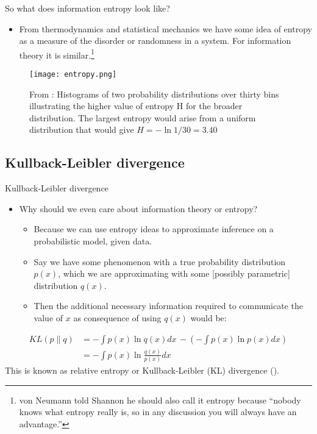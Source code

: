 \documentclass{beamer}
\begin{document}
\begin{frame}{So what does information entropy look like?}
\begin{itemize}
\item From thermodynamics and statistical mechanics we have some idea of entropy as a measure of the disorder or randomness in a system. For information theory it is similar.\footnote{von Neumann told Shannon he should also call it entropy because ``nobody knows what entropy really is, so in any discussion you will always have an advantage.''}
\end{itemize}

\begin{figure}
\texttt{[image: entropy.png]}
\caption{\label{fig:entropy}From \cite{bishop}: Histograms of two probability distributions over thirty bins illustrating the higher value of entropy H for the broader distribution. The largest entropy would arise from a uniform distribution that would give $H = -\ln 1/30 = 3.40$}
\end{figure}

\end{frame}


\subsection{Kullback-Leibler divergence}
\begin{frame}{Kullback-Leibler divergence}
\begin{itemize}
\item Why should we even care about information theory or entropy?
  \begin{itemize}
  \item Because we can use entropy ideas to approximate inference on a probabilistic model, given data.
  \item Say we have some phenomenon with a true probability distribution $p(x)$, which we are approximating with some [possibly parametric] distribution $q(x)$.
  \item Then the additional necessary information required to communicate the value of $x$ as consequence of using $q(x)$ would be:
  \end{itemize}
\end{itemize}
\begin{equation}
  \begin{split}
    KL(p\|q) & = - \int p(x) \ln q(x) dx \, - \left(-\int p(x) \ln p(x) dx \right) \\
    & =  - \int p(x) \ln  \frac{q(x)}{p(x)} dx
  \end{split}
\end{equation}
  This is known as relative entropy or  Kullback-Leibler (KL) divergence (\cite{kullback1951}).
\end{frame}
\end{document}
